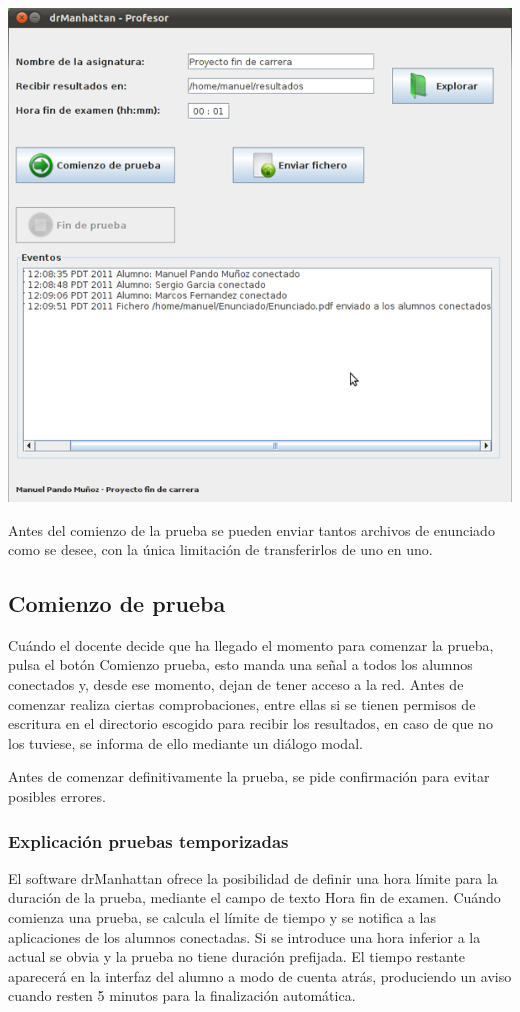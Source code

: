 \documentclass[11pt]{article}
\begin{document}
\begin{center}
    \includegraphics[width=.90\linewidth]{imagenes/eventoEnviar}
\end{center}

Antes del comienzo de la prueba se pueden enviar tantos archivos de enunciado como se desee, con la única limitación de transferirlos de uno en uno.

\subsection{Comienzo de prueba}

Cuándo el docente decide que ha llegado el momento para comenzar la prueba, pulsa el botón Comienzo prueba, esto manda una señal a todos los alumnos conectados y, desde ese momento, dejan de tener acceso a la red.
Antes de comenzar realiza ciertas comprobaciones, entre ellas si se tienen permisos de escritura en el directorio escogido para recibir los resultados, en caso de que no los tuviese, se informa de ello mediante un diálogo modal.

Antes de comenzar definitivamente la prueba, se pide confirmación para evitar posibles errores.

\subsubsection{Explicación pruebas temporizadas}

El software drManhattan ofrece la posibilidad de definir una hora límite para la duración de la prueba, mediante el campo de texto Hora fin de examen. Cuándo comienza una prueba, se calcula el límite de tiempo y se notifica a las aplicaciones de los alumnos conectadas. Si se introduce una hora inferior a la actual se obvia y la prueba no tiene duración prefijada. El tiempo restante aparecerá en la interfaz del alumno a modo de cuenta atrás, produciendo un aviso cuando resten 5 minutos para la finalización automática.
\end{document}
